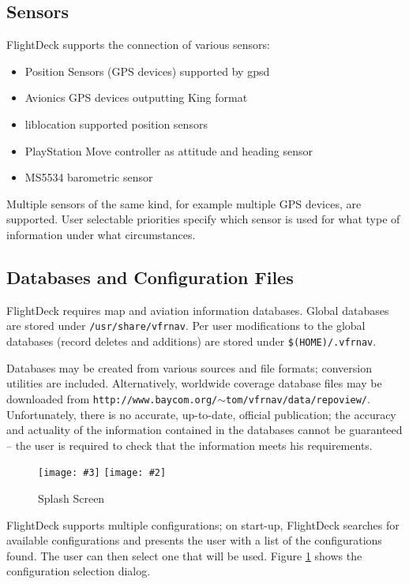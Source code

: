 \documentclass[a4paper,10pt,pdftex]{article}
\newcommand{\jnxfig}[3][]{\ifmypdf\texttt{[image: \#3]}
  \else\texttt{[image: \#2]}\fi}
\begin{document}
\subsection{Sensors}

FlightDeck supports the connection of various sensors:

\begin{itemize}
\item Position Sensors (GPS devices) supported by gpsd
\item Avionics GPS devices outputting King format
\item liblocation supported position sensors
\item PlayStation Move controller as attitude and heading sensor
\item MS5534 barometric sensor
\end{itemize}

Multiple sensors of the same kind, for example multiple GPS devices,
are supported. User selectable priorities specify which sensor is used
for what type of information under what circumstances.

\subsection{Databases and Configuration Files}

FlightDeck requires map and aviation information databases. Global
databases are stored under {\tt /usr/share/vfrnav}. Per user
modifications to the global databases (record deletes and additions)
are stored under {\tt \$(HOME)/.vfrnav}.

Databases may be created from various sources and file formats;
conversion utilities are included. Alternatively, worldwide coverage
database files may be downloaded from
{\tt http://www.baycom.org/$\sim$tom/vfrnav/data/repoview/}. Unfortunately,
there is no accurate, up-to-date, official publication; the accuracy
and actuality of the information contained in the databases cannot be
guaranteed -- the user is required to check that the information meets
his requirements.

\begin{figure}[!htbp]
  \begin{center}
    \jnxfig[scale=0.5]{splashdialog.eps}{splashdialog.png}
    \caption{Splash Screen}
    \label{fig:splashdialog}
  \end{center}
\end{figure}

FlightDeck supports multiple configurations; on start-up, FlightDeck
searches for available configurations and presents the user with a
list of the configurations found. The user can then select one that
will be used. Figure \ref{fig:splashdialog} shows the configuration
selection dialog.
\end{document}
